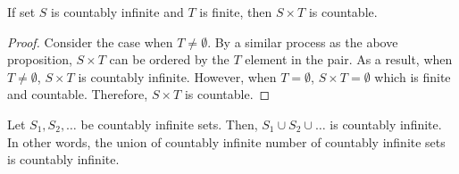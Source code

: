 \bigskip
\begin{proposition}
    If set \(S\) is countably infinite and \(T\) is finite, then \(S\times T\) is countable.
\end{proposition}
\begin{proof}
    Consider the case when \(T\ne\emptyset\). By a similar process as the above proposition, \(S\times T\) can be ordered by the \(T\) element in the pair. As a result,
    when \(T\ne\emptyset\), \(S\times T\) is countably infinite. However, when \(T=\emptyset\), \(S\times T=\emptyset\) which is finite and countable. Therefore,
    \(S\times T\) is countable.
\end{proof}

\bigskip
\begin{proposition}
    Let \(S_1,S_2,\dots\) be countably infinite sets. Then, \(S_1\cup S_2\cup\dots\) is countably infinite. In other words, the union of countably infinite number of
    countably infinite sets is countably infinite.
\end{proposition}
